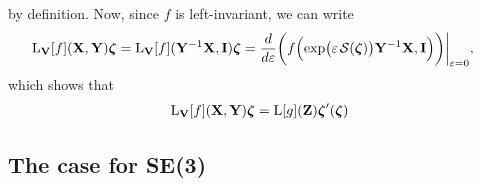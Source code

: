by definition. Now, since $f$ is left-invariant, we can write
\begin{align}
    \Lop_\mathbf{V}[f](\mathbf{X}, \mathbf{Y})\boldsymbol{\zeta} &= 
    \Lop_\mathbf{V}[f](\mathbf{Y}^{-1}\mathbf{X}, \mathbf{I})\boldsymbol{\zeta}
    = \frac{d}{d\varepsilon}\biggl(f\Bigl(\exp\bigl(\varepsilon\SL[\boldsymbol{\zeta}]\bigr)\mathbf{Y}^{-1}\mathbf{X}, \mathbf{I}\Bigr)\biggr)\biggr|_{\varepsilon=0},
\end{align}
which shows that
\begin{align}
    \operatorname{L}_\mathbf{V}[f](\mathbf{X}, \mathbf{Y})\boldsymbol{\zeta} = \operatorname{L}[g](\mathbf{Z})\boldsymbol{\zeta}'(\boldsymbol{\zeta})
\end{align}
\subsection{The case for SE(3)}